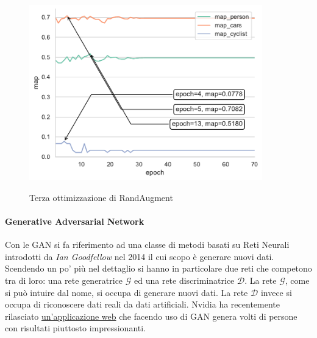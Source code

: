 \begin{figure}[]
\begin{minipage}{.5\linewidth}
{            \includegraphics[width =0.90\textwidth]{images/graphic/graphics_map_ra_cars.pdf}
        }
    \end{minipage}%
    \centering
    \caption{Terza ottimizzazione di RandAugment}
    \label{fig:RA_3}
\end{figure}



\paragraph{Generative Adversarial Network}
Con le \acf{GAN} si fa riferimento ad una classe di metodi basati su Reti Neurali introdotti da \textit{Ian Goodfellow} \cite{goodfellow2014generative} nel 2014 il cui scopo è generare nuovi dati. Scendendo un po' più nel dettaglio si hanno in particolare due reti che competono tra di loro: una rete generatrice $\mathcal{G}$ ed una rete discriminatrice $\mathcal{D}$. La rete $\mathcal{G}$, come si può intuire dal nome, si occupa di generare nuovi dati. La rete $\mathcal{D}$ invece si occupa di riconoscere dati reali da dati artificiali. Nvidia ha recentemente rilasciato \href{https://www.thispersondoesnotexist.com/}{un'applicazione web} \cite{Karras2019stylegan2} che facendo uso di \ac{GAN} genera volti di persone con risultati piuttosto impressionanti. 

